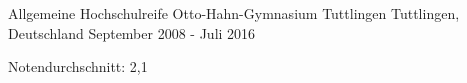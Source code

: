 \begin{cventries}
    \cventry
    {Allgemeine Hochschulreife} %
    {Otto-Hahn-Gymnasium Tuttlingen} %
    {Tuttlingen, Deutschland} %
    {September 2008 - Juli 2016} %
    {
      \begin{cvitems} %
        \item {Notendurchschnitt: 2,1}
      \end{cvitems}
    }

\end{cventries}
